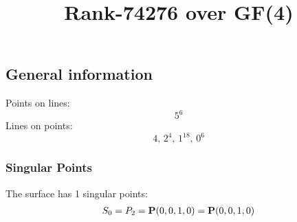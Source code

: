 \documentclass{article}
\newcommand\setTBstruts{\def\T{\rule{0pt}{2.6ex}}%
\def\B{\rule[-1.2ex]{0pt}{0pt}}}
\newcommand{\bP}{{\bf P}}
\begin{document}
 
\setTBstruts



{\allowdisplaybreaks%






\title{Rank-74276 over GF(4)}
\author{}%
\maketitle%
%
{}



\subsection*{General information}
Points on lines:
$$
5^6$$
Lines on points:
$$
4,\,2^4,\,1^{18},\,0^6$$
\subsubsection*{Singular Points}
The surface has 1 singular points:\\
\begin{align*}
S_{0} &= P_{2}=\bP(0, 0, 1, 0) = \bP(0, 0, 1, 0)\\
\end{align*}
}
\end{document}
